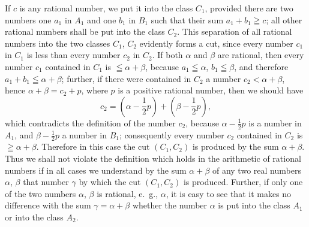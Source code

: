 \documentclass[polutonikogreek,english,twoside,openright]{article}
\begin{document}
If $c$ is any rational number, we put it into the class $C_1$,
provided there are two numbers one $a_1$ in $A_1$ and one $b_1$ in
$B_1$ such that their sum $a_1+b_1 \geqq c$; all other rational
numbers shall be put into the class $C_2$. This separation of all
rational numbers into the two classes $C_1$, $C_2$ evidently forms a
cut, since every number $c_1$ in $C_1$ is less than every number $c_2$
in $C_2$. If both $\alpha$ and $\beta$ are rational, then every number
$c_1$ contained in $C_1$ is $\leqq\alpha+\beta$, because
$a_1\leqq\alpha$, $b_1\leqq\beta$, and therefore
$a_1+b_1 \leqq\alpha+\beta$; further, if there were contained in $C_2$
a number $c_2<\alpha+\beta$, hence $\alpha+\beta=c_2+p$, where $p$ is
a positive rational number, then we should have
\[
c_2=(\alpha- \frac{1}{2} p)+(\beta- \frac{1}{2} p),
\]
which contradicts the definition of the number $c_2$, because
$\alpha- \frac{1}{2} p$ is a number in $A_1$, and
$\beta- \frac{1}{2} p$ a number in $B_1$; consequently every number
$c_2$ contained in $C_2$ is $\geqq\alpha+\beta$. Therefore in this
case the cut $(C_1, C_2)$ is produced by the sum $\alpha+\beta$. Thus
we shall not violate the definition which holds in the arithmetic of
rational numbers if in all cases we understand by the sum
$\alpha+\beta$ of any two real numbers $\alpha$, $\beta$ that number
$\gamma$ by which the cut $(C_1, C_2)$ is produced. Further, if only
one of the two numbers $\alpha$, $\beta$ is rational, e.~g., $\alpha$,
it is easy to see that it makes no difference with the sum
$\gamma=\alpha+\beta$ whether the number $\alpha$ is put into the
class $A_1$ or into the class $A_2$.
\end{document}
